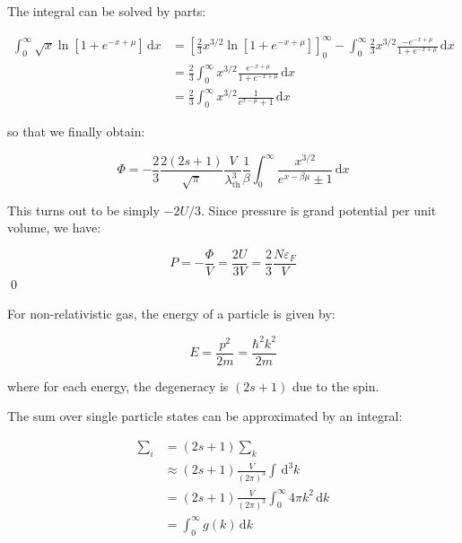 \documentclass[12pt]{article}
\begin{document}
The integral can be solved by parts:

\begin{equation}
    \begin{split}
        \int_{0}^{\infty} \sqrt{x} \ln{\left[ 1 + e^{-x + \mu} \right]} \, \mathrm{d}x &= \left[ \frac{2}{3} x^{3/2} \ln{\left[ 1 + e^{-x + \mu} \right]} \right]_{0}^{\infty} - \int_{0}^{\infty} \frac{2}{3} x^{3/2} \frac{-e^{-x + \mu}}{1 + e^{-x + \mu}} \, \mathrm{d}x \\
        &= \frac{2}{3} \int_{0}^{\infty} x^{3/2} \frac{e^{-x + \mu}}{1 + e^{-x + \mu}} \, \mathrm{d}x \\
        &= \frac{2}{3} \int_{0}^{\infty} x^{3/2} \frac{1}{e^{x - \mu} + 1} \, \mathrm{d}x
    \end{split}
\end{equation}

so that we finally obtain:

\begin{equation}
    \Phi = -\frac{2}{3} \frac{2(2s+1)}{\sqrt{\pi}} \frac{V}{\lambda_{\text{th}}^3} \frac{1}{\beta} \int_{0}^{\infty} \frac{x^{3/2}}{e^{x - \beta \mu} \pm 1} \, \mathrm{d}x
\end{equation}

This turns out to be simply $-2U/3$. Since pressure is grand potential per unit volume, we have:

\begin{equation}
    P = -\frac{\Phi}{V} = \frac{2U}{3V} = \frac{2}{3} \frac{N \varepsilon_{F}}{V}
\end{equation}
\qed



For non-relativistic gas, the energy of a particle is given by:

\begin{equation}
    E = \frac{p^{2}}{2m} = \frac{\hbar^{2} k^{2}}{2m}
\end{equation}

where for each energy, the degeneracy is $(2s + 1)$ due to the spin.

The sum over single particle states can be approximated by an integral:

\begin{equation}
    \begin{split}
        \sum_{i} &= (2s + 1) \sum_{k} \\
        &\approx (2s + 1) \frac{V}{(2\pi)^{3}} \int \, \mathrm{d}^{3}k \\
        &= (2s + 1) \frac{V}{(2\pi)^{3}} \int_{0}^{\infty} 4\pi k^{2} \, \mathrm{d}k \\
        &= \int_{0}^{\infty} g(k) \, \mathrm{d}k
    \end{split}
\end{equation}
\end{document}
